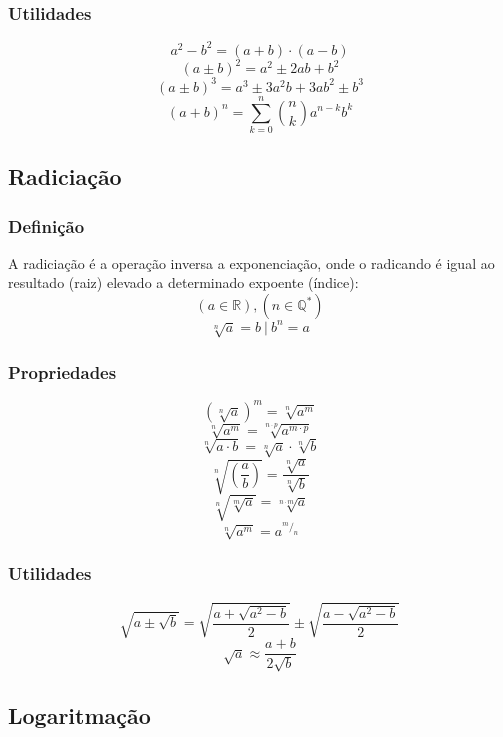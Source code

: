     \subsubsection{Utilidades}
        \begin{multicols}{2}
            \noindent\[ a^2 - b^2 = (a+b) \cdot (a-b) \]
            \[ (a \pm b)^2 = a^2 \pm 2ab + b^2 \]
            \newcolumn
            \[ (a \pm b)^3 = a^3 \pm 3a^{2}b + 3ab^2 \pm b^3 \]
            \[ (a+b)^n = \displaystyle\sum_{k=0}^{n} {\binom{n}{k} a^{n-k} b^k} \]
        \end{multicols}
\subsection{Radiciação}
    \subsubsection{Definição}
        A radiciação é a operação inversa a exponenciação, onde o radicando é igual ao resultado (raiz) elevado a determinado expoente (índice):
        \[ (a \in \mathbb{R}), (n \in \mathbb{Q}^*) \]
        \[ \sqrt[n]{a} = b \ | \ b^n = a \]
    \subsubsection{Propriedades}
        \begin{multicols}{3}
            \noindent\[ (\sqrt[n]{a})^m = \sqrt[n]{a^m} \]
            \[ \sqrt[n]{a^m} = \sqrt[n \cdot p]{a^{m \cdot p}} \]
            \[ \sqrt[n]{a \cdot b} = \sqrt[n]{a} \cdot \sqrt[n]{b} \]
            \[ \sqrt[n]{\left(\frac{a}{b} \right)}= \frac{\sqrt[n]{a}}{\sqrt[n]{b}} \]
            \[ \sqrt[n]{\sqrt[m]{a}} = \sqrt[n \cdot m]{a} \]
            \[ \sqrt[n]{a^m} = a^{^m/_n} \]
        \end{multicols}
    \subsubsection{Utilidades}
        \begin{multicols}{2}
            \noindent\[ \sqrt{a \pm \sqrt{b}} = \sqrt{\frac{a + \sqrt{a^{2}-b}}{2}} \pm \sqrt{\frac{a - \sqrt{a^{2}-b}}{2}} \]
            \[ \sqrt{a} \approx \frac{a+b}{2 \sqrt{b}} \]
        \end{multicols}
\subsection{Logaritmação}

